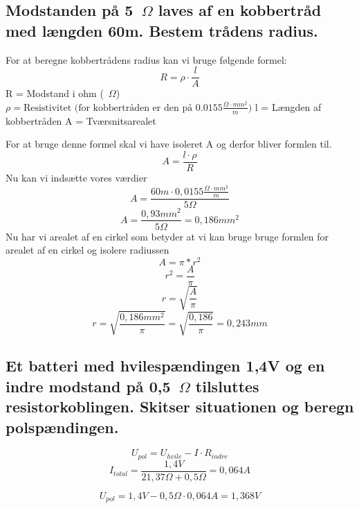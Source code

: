 \subsection{Modstanden på 5~$\Omega$ laves af en kobbertråd med længden 60m. Bestem trådens radius.}
For at beregne kobbertrådens radius kan vi bruge følgende formel:
\begin{equation*}
    R=\rho\cdot\frac{l}{A}
\end{equation*}
R = Modstand i ohm (~$\Omega$)\newline
\begin{math}
    \rho = \text{Resistivitet (for kobbertråden er den på } 0.0155 \frac{\Omega \cdot mm^{2}}{m})
\end{math}\newline
l = Længden af kobbertråden\newline
A = Tværsnitsarealet\newline

For at bruge denne formel skal vi have isoleret A og derfor bliver formlen til.
\begin{equation*}
    A=\frac{l\cdot\rho}{R}
\end{equation*}
Nu kan vi indsætte vores værdier
\begin{equation*}
    A=\frac{60m\cdot0,0155\frac{\Omega\cdot mm^{2}}{m}}{5\Omega}
\end{equation*}
\begin{equation*}
    A=\frac{0,93mm^{2}}{5\Omega}=0,186mm^{2}
\end{equation*}
Nu har vi arealet af en cirkel som betyder at vi kan bruge bruge formlen for arealet af en cirkel og isolere radiussen
\begin{equation*}
    A=\pi*r^{2}
\end{equation*}
\begin{equation*}
    r^{2}=\frac{A}{\pi}
\end{equation*}
\begin{equation*}
    r=\sqrt{\frac{A}{\pi}}
\end{equation*}
\begin{equation*}
    r=\sqrt{\frac{0,186mm^{2}}{\pi}} = \sqrt{\frac{0,186}{\pi}} = 0,243mm
\end{equation*}

\subsection{Et batteri med hvilespændingen 1,4V og en indre modstand på 0,5~$\Omega$ tilsluttes resistorkoblingen. Skitser situationen og beregn polspændingen.}
\begin{equation*}
    U_{pol}=U_{hvile}-I\cdot R_{indre}
\end{equation*}
\begin{equation*}
    I_{total}=\frac{1,4V}{21,37\Omega+0,5\Omega}=0,064A
\end{equation*}

\begin{equation*}
    U_{pol}=1,4V-0,5\Omega\cdot 0,064A=1,368V
\end{equation*}
\newpage
